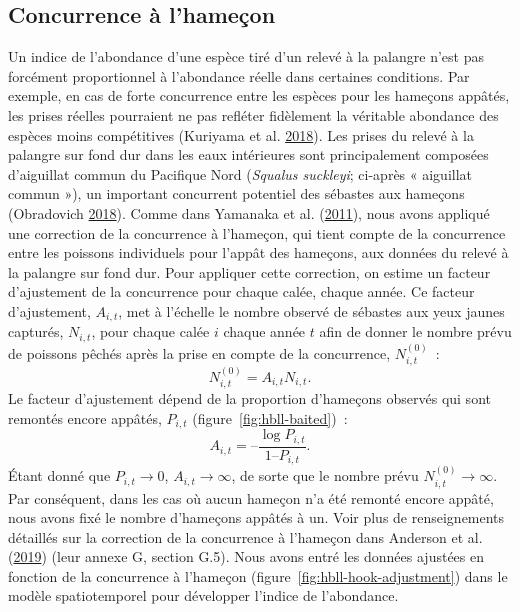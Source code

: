 \documentclass[11pt]{book}
\begin{document}
\hypertarget{sec:hbll-hook-competition}{%
\subsection{Concurrence à l'hameçon}\label{sec:hbll-hook-competition}}

Un indice de l'abondance d'une espèce tiré d'un relevé à la palangre n'est pas forcément proportionnel à l'abondance réelle dans certaines conditions. Par exemple, en cas de forte concurrence entre les espèces pour les hameçons appâtés, les prises réelles pourraient ne pas refléter fidèlement la véritable abondance des espèces moins compétitives (Kuriyama et al. \protect\hyperlink{ref-kuriyama2018}{2018}). Les prises du relevé à la palangre sur fond dur dans les eaux intérieures sont principalement composées d'aiguillat commun du Pacifique Nord (\emph{Squalus suckleyi}; ci-après « aiguillat commun »), un important concurrent potentiel des sébastes aux hameçons (Obradovich \protect\hyperlink{ref-obradovich2018}{2018}). Comme dans Yamanaka et al. (\protect\hyperlink{ref-yamanaka2011}{2011}), nous avons appliqué une correction de la concurrence à l'hameçon, qui tient compte de la concurrence entre les poissons individuels pour l'appât des hameçons, aux données du relevé à la palangre sur fond dur. Pour appliquer cette correction, on estime un facteur d'ajustement de la concurrence pour chaque calée, chaque année. Ce facteur d'ajustement, \(A_{i,t}\), met à l'échelle le nombre observé de sébastes aux yeux jaunes capturés, \(N_{i,t}\), pour chaque calée \(i\) chaque année \(t\) afin de donner le nombre prévu de poissons pêchés après la prise en compte de la concurrence, \(N_{i,t}^{(0)}\)~:
\begin{equation}
N_{i,t}^{(0)} = A_{i,t} N_{i,t}.
\label{eq:Nit}
\end{equation}
Le facteur d'ajustement dépend de la proportion d'hameçons observés qui sont remontés encore appâtés, \(P_{i,t}\) (figure~\ref{fig:hbll-baited})~:
\begin{equation}
A_{i,t} = – \frac{ \log P_{i,t}}{1 – P_{i,t}}.
\label{eq:hbll-hook-adjustment}
\end{equation}
Étant donné que \(P_{i,t} \rightarrow 0\), \(A_{i,t} \rightarrow \infty\), de sorte que le nombre prévu \(N_{i,t}^{(0)} \rightarrow \infty\). Par conséquent, dans les cas où aucun hameçon n'a été remonté encore appâté, nous avons fixé le nombre d'hameçons appâtés à un. Voir plus de renseignements détaillés sur la correction de la concurrence à l'hameçon dans Anderson et al. (\protect\hyperlink{ref-anderson2019synopsis}{2019}) (leur annexe G, section G.5). Nous avons entré les données ajustées en fonction de la concurrence à l'hameçon (figure~\ref{fig:hbll-hook-adjustment}) dans le modèle spatiotemporel pour développer l'indice de l'abondance.
\end{document}
